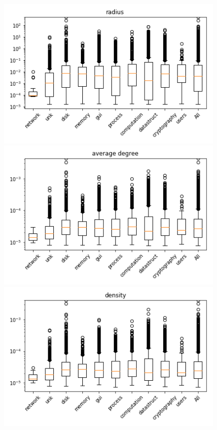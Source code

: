 \begin{appendices}
\begin{figure}[H]
\vfill 

%
\centering
\includegraphics[width=0.9\linewidth]{img/boxplots/v1_unbalanced_radius.png}
\endminipage
{}%
\centering
\includegraphics[width=0.9\linewidth]{img/boxplots/v1_unbalanced_average_degree.png}
\endminipage
{}%
\centering
\includegraphics[width=0.9\linewidth]{img/boxplots/v1_unbalanced_density.png}
\endminipage


\end{figure}
\end{appendices}

